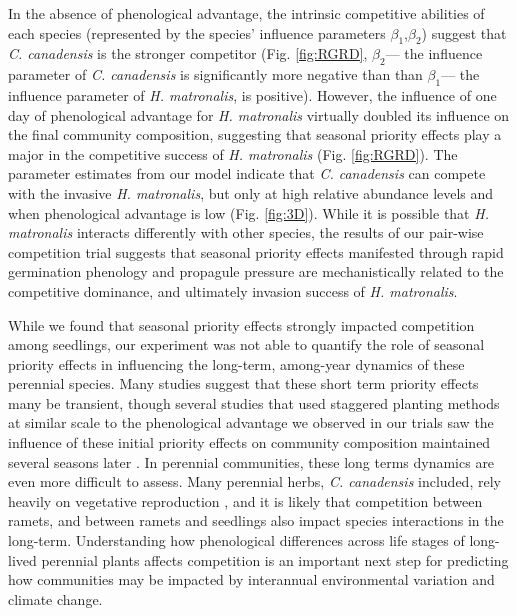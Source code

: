 \documentclass{article}[11pt]
\begin{document}
In the absence of phenological advantage, the intrinsic competitive abilities of each species (represented by the species' influence parameters $\beta_{1}$,$\beta_{2}$) suggest that \textit{C. canadensis} is the stronger competitor (Fig. \ref{fig:RGRD}, $\beta_{2}$--- the influence parameter of \textit{C. canadensis} is significantly more negative than than $\beta_{1}$--- the influence parameter of \textit{H. matronalis}, is positive). However, the influence of one day of phenological advantage for \textit{H. matronalis} virtually doubled its influence on the final community composition, suggesting that seasonal priority effects play a major in the competitive success of \textit{H. matronalis} (Fig. \ref{fig:RGRD}). The parameter estimates from our model indicate that \textit{C. canadensis} can compete with the invasive \textit{H. matronalis}, but only at high relative abundance levels and when phenological advantage is low (Fig. \ref{fig:3D}). While it is possible that \textit{H. matronalis} interacts differently with other species, the results of our pair-wise competition trial suggests that seasonal priority effects manifested through rapid germination phenology and propagule pressure are mechanistically related to the competitive dominance, and ultimately invasion success of \textit{H. matronalis}.

While we found that seasonal priority effects strongly impacted competition among seedlings, our experiment was not able to quantify the role of seasonal priority effects in influencing the long-term, among-year dynamics of these perennial species. %
Many studies suggest that these short term priority effects many be transient, though several studies that used staggered planting methods at similar scale to the phenological advantage we observed in our trials saw the influence of these initial priority effects on community composition maintained several seasons later \citep{Vaughn:2015wp,Young:2017aa,Torrez:2017to}. In perennial communities, these long terms dynamics are even more difficult to assess. Many perennial herbs, \textit{C. canadensis} included, rely heavily on vegetative reproduction \citep{Hawkins:2005ve}, and it is likely that competition between ramets, and between ramets and seedlings also impact species interactions in the long-term. %
Understanding how phenological differences across life stages of long-lived perennial plants affects competition is an important next step for predicting how communities may be impacted by interannual environmental variation and climate change.
\end{document}

